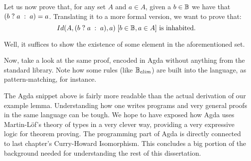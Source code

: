 Let us now prove that, for any set $A$ and $a \in A$, given a $b \in \BB$ we have
that $\ite{b}{a}{a} = a$. Translating it to a more formal version, we want to prove that:
\[
  \withhip{b \in \BB, a \in A}{Id(A, \ite{b}{a}{a}, a)} \text{ is inhabited.}
\]

Well, it suffices to show the existence of some element in the aforementioned set.



Now, take a look at the same proof, encoded in Agda without anything from the standard library.
Note how some rules (like $\BB_{elim}$) are built into the language, as pattern-matching, for instance.


The Agda snippet above is fairly more readable than the actual derivation of our example lemma.
Understanding how one writes programs and very general proofs in the same language can be tough.
We hope to have exposed how Agda uses Martin-L\"{o}f's theory of types in a very clever way, 
providing a very expressive logic for theorem proving. The programming
part of Agda is directly connected to last chapter's Curry-Howard Isomorphism.
This concludes a big portion of the background needed for understanding the rest of this dissertation.


